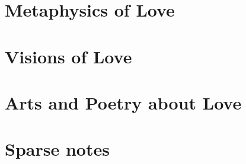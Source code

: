 \documentclass[a4paper,12pt,twoside]{book}
\begin{document}
\chapter{Metaphysics of Love}













\chapter{Visions of Love}






\chapter{Arts and Poetry about Love}









\chapter{Sparse notes}













\end{document}
